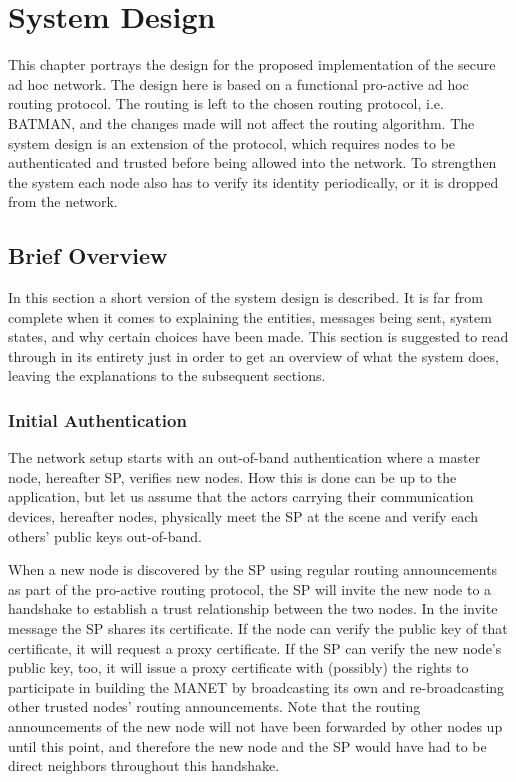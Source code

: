 \chapter{System Design}
\label{ch:design}
\acresetall

This chapter portrays the design for the proposed implementation of the secure
ad hoc network. The design here is based on a functional pro-active ad hoc
routing protocol. The routing is left to the chosen routing protocol, i.e.
\ac{BATMAN}, and the changes made will not affect the routing algorithm.
The system design is an extension of the protocol, which requires nodes to be
authenticated and trusted before being allowed into the network. To strengthen
the system each node also has to verify its identity periodically, or it is
dropped from the network.

\section{Brief Overview}
In this section a short version of the system design is described. It is far
from complete when it comes to explaining the entities, messages being sent,
system states, and why certain choices have been made. This section is
suggested to read through in its entirety just in order to get an overview of
what the system does, leaving the explanations to the subsequent sections.

\subsection{Initial Authentication}
The network setup starts with an out-of-band authentication where a master node,
hereafter \ac{SP}, verifies new nodes. How this is done can be up to the
application, but let us assume that the actors carrying their communication
devices, hereafter nodes, physically meet the \ac{SP} at the scene and verify
each others' public keys out-of-band.

When a new node is discovered by the \ac{SP} using regular routing announcements
as part of the pro-active routing protocol, the \ac{SP} will invite the new node
to a handshake to establish a trust relationship between the two nodes. In the
invite message the \ac{SP} shares its certificate. If the node can verify the
public key of that certificate, it will request a proxy certificate. If the
\ac{SP} can verify the new node's public key, too, it will issue a proxy
certificate with (possibly) the rights to participate in building the
\ac{MANET} by broadcasting its own and re-broadcasting other trusted nodes'
routing announcements. Note that the routing announcements of the new node will
not have been forwarded by other nodes up until this point, and therefore the
new node and the \ac{SP} would have had to be direct neighbors throughout this
handshake.

